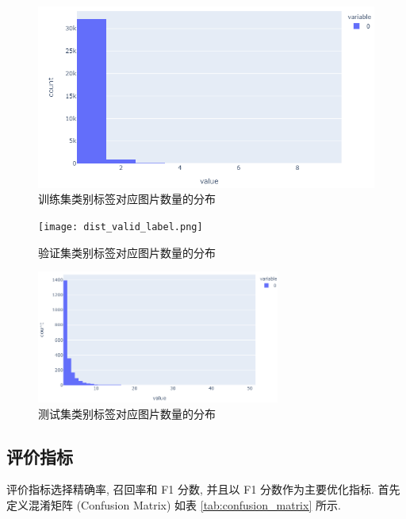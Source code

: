 \documentclass[12pt]{article}
\begin{document}
\begin{figure}[htbp]
  \centering
  \includegraphics[width=12cm]{dist_train_label.png}
  \caption{训练集类别标签对应图片数量的分布}
  \label{fig:dist_train_label}
\end{figure}

\begin{figure}[htbp]
  \centering
  \begin{minipage}[t]{0.48\textwidth}
    \centering
    \texttt{[image: dist\_valid\_label.png]}
    \caption{验证集类别标签对应图片数量的分布}
    \label{fig:dist_valid_label}
  \end{minipage}
  \begin{minipage}[t]{0.48\textwidth}
    \centering
    \includegraphics[width=8cm]{dist_test_label.png}
    \caption{测试集类别标签对应图片数量的分布}
    \label{fig:dist_test_label}
  \end{minipage}
\end{figure}

\subsection{评价指标}



评价指标选择精确率, 召回率和 F1 分数, 并且以 F1 分数作为主要优化指标. 首先定义混淆矩阵 (Confusion Matrix) 如表 \ref{tab:confusion_matrix} 所示.
\end{document}
